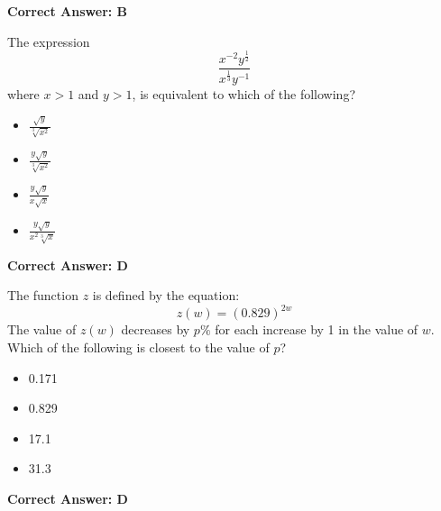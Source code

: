 \documentclass{article}
\begin{document}
\begin{tcolorbox}[colback=green!10, colframe=green!50!black,title=Answer to Question 8]
\textbf{Correct Answer: B}  
\end{tcolorbox}



\begin{tcolorbox}[colback=blue!5!white,colframe=blue!75!black,title=Question 9]
The expression 
\[
\frac{x^{-2} y^{\frac{1}{2}}}{x^{\frac{1}{3}} y^{-1}}
\]
where \( x > 1 \) and \( y > 1 \), is equivalent to which of the following?

\begin{itemize}
    \item[A.] \( \frac{\sqrt{y}}{\sqrt[3]{x^2}} \)
    \item[B.] \( \frac{y \sqrt{y}}{\sqrt[3]{x^2}} \)
    \item[C.] \( \frac{y \sqrt{y}}{x \sqrt{x}} \)
    \item[D.] \( \frac{y \sqrt{y}}{x^2 \sqrt[3]{x}} \)
\end{itemize}
\end{tcolorbox}

\begin{tcolorbox}[colback=green!10, colframe=green!50!black,title=Answer to Question 9]
\textbf{Correct Answer: D}  
\end{tcolorbox}

\newpage

\begin{tcolorbox}[colback=blue!5!white,colframe=blue!75!black,title=Question 10]
The function \( z \) is defined by the equation:
\[
z(w) = (0.829)^{2w}
\]
The value of \( z(w) \) decreases by \( p\% \) for each increase by 1 in the value of \( w \). Which of the following is closest to the value of \( p \)?

\begin{itemize}
    \item[A.] 0.171
    \item[B.] 0.829
    \item[C.] 17.1
    \item[D.] 31.3
\end{itemize}
\end{tcolorbox}

\begin{tcolorbox}[colback=green!10, colframe=green!50!black,title=Answer to Question 10]
\textbf{Correct Answer: D}  
\end{tcolorbox}

\vspace{20pt}
\end{document}
